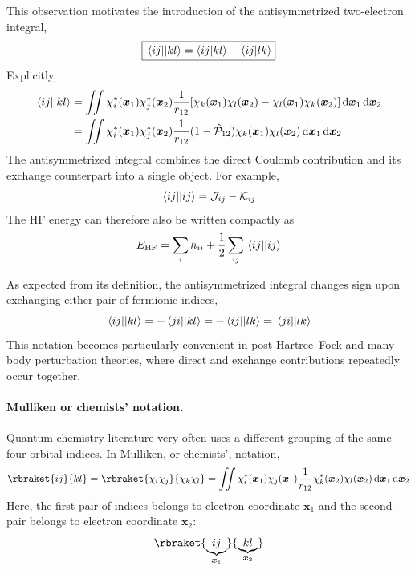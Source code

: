 \documentclass[11pt,a4paper,titlepage]{article}
\numberwithin{equation}{section}
\newcommand{\EHF}{E_\text{HF}}
\newcommand{\bx}{\boldsymbol{x}}
\newcommand{\chP}{\Hat{\mathcal{P}}}
\newcommand{\cJ}{\mathcal{J}}
\newcommand{\cK}{\mathcal{K}}
\begin{document}
This observation motivates the introduction of the
antisymmetrized two-electron integral,
\begin{equation}
  \boxed{
  \mel{ij}{}{kl}
  =
  \braket{ij}{kl}
  -
  \braket{ij}{lk}
  }
  \label{eq:antisymmetrized-eri}
\end{equation}
Explicitly,
\begin{equation}
\begin{split}
  \mel{ij}{}{kl}
  &=
  \iint
  \chi_i^*(\bx_1)
  \chi_j^*(\bx_2)
  \frac{1}{r_{12}}
  \qty[
    \chi_k(\bx_1)\chi_l(\bx_2)
    -
    \chi_l(\bx_1)\chi_k(\bx_2)
  ]
  \dd{\bx_1}\dd{\bx_2}
  \\
  &=
  \iint
  \chi_i^*(\bx_1)
  \chi_j^*(\bx_2)
  \frac{1}{r_{12}}
  (1-\chP_{12})
  \chi_k(\bx_1)\chi_l(\bx_2)
  \dd{\bx_1}\dd{\bx_2}
\end{split}
\end{equation}
The antisymmetrized integral combines the direct Coulomb contribution and
its exchange counterpart into a single object. For example,
\begin{equation}
  \mel{ij}{}{ij}
  =
  \cJ_{ij}-\cK_{ij}
\end{equation}
The HF energy can therefore also be written compactly as
\begin{equation}
  \EHF
  =
  \sum_i h_{ii}
  +
  \frac{1}{2}
  \sum_{ij}
  \mel{ij}{}{ij}
\end{equation}

As expected from its definition, the antisymmetrized integral changes sign
upon exchanging either pair of fermionic indices,
\begin{equation}
  \mel{ij}{}{kl}
  =
  -\mel{ji}{}{kl}
  =
  -\mel{ij}{}{lk}
  =
  \mel{ji}{}{lk}
\end{equation}
This notation becomes particularly convenient in post-Hartree--Fock and
many-body perturbation theories, where direct and exchange contributions
repeatedly occur together.

\paragraph{Mulliken or chemists' notation.}

Quantum-chemistry literature very often uses a different grouping of the
same four orbital indices. In Mulliken, or chemists', notation,
\begin{equation}
  \rbraket{ij}{kl}
  =
  \rbraket{\chi_i\chi_j}{\chi_k\chi_l}
  =
  \iint
  \chi_i^*(\bx_1)
  \chi_j(\bx_1)
  \frac{1}{r_{12}}
  \chi_k^*(\bx_2)
  \chi_l(\bx_2)
  \dd{\bx_1}\dd{\bx_2}
  \label{eq:eri-chemists}
\end{equation}
Here, the first pair of indices belongs to electron coordinate $\bx_1$ and
the second pair belongs to electron coordinate $\bx_2$:
\begin{equation}
  \rbraket{
    \underbrace{ij}_{\bx_1}
  }{
    \underbrace{kl}_{\bx_2}
  }
\end{equation}
\end{document}
